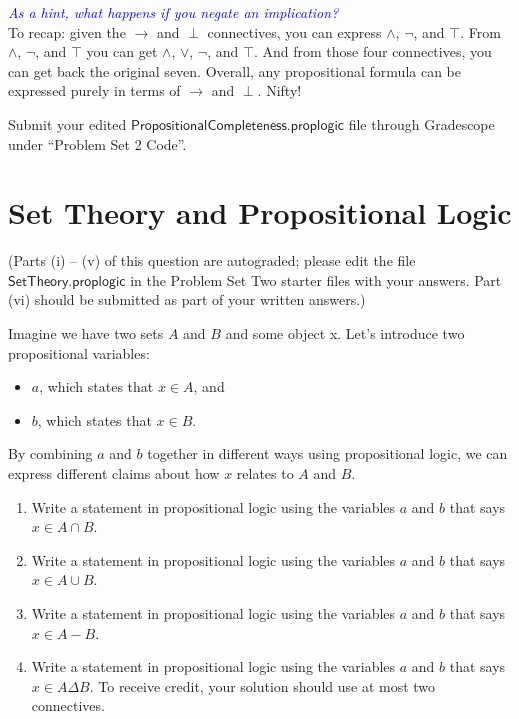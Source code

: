 \documentclass{article}
\renewcommand{\(}{\left(}
\renewcommand{\)}{\right)}
\theoremstyle{plain}
\theoremstyle{plain}
\theoremstyle{definition}
\newcommand{\annotate}[1]{\textit{\textcolor{blue}{#1}}}
\begin{document}
\annotate{As a hint, what happens if you negate an implication?} \\

To recap: given the $\rightarrow$ and $\perp$ connectives, you can express $\land$, $\neg$, and $\top$. From $\land$, $\neg$, and $\top$ you can get $\land$, $\lor$, $\neg$, and $\top$. And from those four connectives, you can get back the original seven. Overall, any propositional formula can be expressed purely in terms of $\rightarrow$ and $\perp$. Nifty!

\begin{shaded}
  Submit your edited $\mathsf{PropositionalCompleteness.proplogic}$ file
  through Gradescope under ``Problem Set 2 Code''.
\end{shaded}

\pagebreak

\section{Set Theory and Propositional Logic}

(Parts (i) -- (v) of this question are autograded; please edit the file
$\mathsf{SetTheory.proplogic}$ in the Problem Set Two starter files with your
answers. Part (vi) should be submitted as part of your written answers.)

Imagine we have two sets $A$ and $B$ and some object x. Let's introduce two
propositional variables:
\begin{itemize}
  \item $a$, which states that $x \in A$, and
  \item $b$, which states that $x \in B$.
\end{itemize}

By combining $a$ and $b$ together in different ways using propositional logic,
we can express different claims about how $x$ relates to $A$ and $B$.

\begin{enumerate}[label*=\roman*.,ref=\roman*]
    \item Write a statement in propositional logic using the variables $a$ and $b$ that says $x \in A \cap B$.
    \item Write a statement in propositional logic using the variables $a$ and $b$ that says $x \in A \cup B$.
    \item Write a statement in propositional logic using the variables $a$ and $b$ that says $x \in A - B$.
    \item Write a statement in propositional logic using the variables $a$ and $b$ that says $x \in A \Delta B$. To receive credit, your solution should use at most two connectives. 
\end{enumerate}
\end{document}
